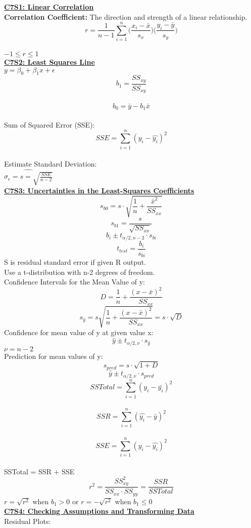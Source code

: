 \documentclass[letter, 12pt]{article}
\begin{document}
\begin{multicols}{2}
\textbf{\uline{C7S1: Linear Correlation}}\\
\textbf{Correlation Coefficient:} The direction and strength of a linear relationship.
\[r=\frac{1}{n-1}\sum_{i=1}^n \biggr(\frac{x_i-\bar{x}}{s_x}\biggr)\biggr(\frac{y_i-\bar{y}}{s_y}\biggr)\]\\
\(-1\leq r \leq 1\)\\
\textbf{\uline{C7S2: Least Squares Line}}\\
\(y=\beta_0+\beta_1x+\epsilon\)\\
\[b_1=\frac{SS_{xy}}{SS_{xy}}\]\\
\[b_0=\bar{y}-b_1\bar{x}\]\\
Sum of Squared Error (SSE):\\
\[SSE = \sum_{i=1}^n(y_i-\hat{y_i})^2\]\\
Estimate Standard Deviation:\\
\(\hat{\sigma_\epsilon = s = \sqrt{\frac{SSE}{n-2}}}\)\\
\textbf{\uline{C7S3: Uncertainties in the Least-Squares Coefficients}}\\
\[s_{b0} = s\cdot\sqrt{\frac{1}{n}+\frac{\bar{x}^2}{SS_{xx}}}\]
\[s_{b1} = \frac{s}{\sqrt{SS_{xx}}}\]
\[b_i \pm t_{\alpha/2, n-2} \cdot s_{bi}\]
\[t_{test} = \frac{b_i}{s_{bi}}\]
S is residual standard error if given R output.\\
Use a t-distribution with n-2 degrees of freedom.\\
Confidence Intervals for the Mean Value of y:
\[D = \frac{1}{n}+\frac{(x-\bar{x})^2}{SS_{xx}}\]
\[s_{\hat{y}} = s\sqrt{\frac{1}{n}+\frac{(x-\bar{x})^2}{SS_{xx}}} = s\cdot\sqrt{D}\]
Confidence for mean value of y at given value x:
\[\hat{y} \pm t_{\alpha/2, \nu} \cdot s_{\hat{y}}\]
\(\nu = n-2\)\\
Prediction for mean values of y:
\[s_{pred} = s\cdot\sqrt{1+D}\]
\[\hat{y} \pm t_{\alpha/2, \nu} \cdot s_{pred}\]
\[SSTotal = \sum_{i=1}^n(y_i-\bar{y_i})^2\]\\
\[SSR = \sum_{i=1}^n(\hat{y_i}-\bar{y})^2\]\\
\[SSE = \sum_{i=1}^n(y_i-\hat{y_i})^2\]\\
SSTotal = SSR + SSE
\[r^2 = \frac{SS^2_{xy}}{SS_{xx}\cdot SS_{yy}} = \frac{SSR}{SSTotal}\]
\(r = \sqrt{r^2}\) when \(b_1 > 0\) or \(r = -\sqrt{r^2}\) when \(b_1 \leq 0\)\\
\textbf{\uline{C7S4: Checking Assumptions and Transforming Data}}\\
Residual Plots:\\

\end{multicols}
\end{document}
